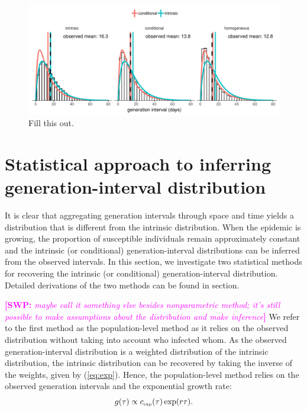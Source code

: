 \documentclass[12pt]{article}
\newcommand{\eref}[1]{(\ref{eq:#1})}
\newcommand{\tsub}[2]{#1_{{\textrm{\tiny #2}}}}
\newcommand{\comment}[3]{\textcolor{#1}{\textbf{[#2: }\textsl{#3}\textbf{]}}}
\newcommand{\swp}[1]{\comment{magenta}{SWP}{#1}}
\begin{document}
\begin{figure}
\includegraphics[width=\textwidth]{../fig/local_effect.pdf}
\caption{Fill this out.}
\label{fig:local}
\end{figure}

\section{Statistical approach to inferring generation-interval distribution}

It is clear that aggregating generation intervals through space and time yields a distribution that is different from the intrinsic distribution.
When the epidemic is growing, the proportion of susceptible individuals remain approximately constant and the intrinsic (or conditional) generation-interval distributions can be inferred from the observed intervals.
In this section, we investigate two statistical methods for recovering the intrinsic (or conditional) generation-interval distribution.
Detailed derivations of the two methods can be found in section.

\swp{maybe call it something else besides nonparametric method; it's still possible to make assumptions about the distribution and make inference}
We refer to the first method as the population-level method as it relies on the observed distribution without taking into account who infected whom.
As the observed generation-interval distribution is a weighted distribution of the intrinsic distribution, the intrinsic distribution can be recovered by taking the inverse of the weights, given by \eref{exp}.
Hence, the population-level method relies on the observed generation intervals and the exponential growth rate:
\begin{equation}
g(\tau) \propto \tsub{c}{exp}(\tau) \exp(r\tau).
\end{equation}
\end{document}
